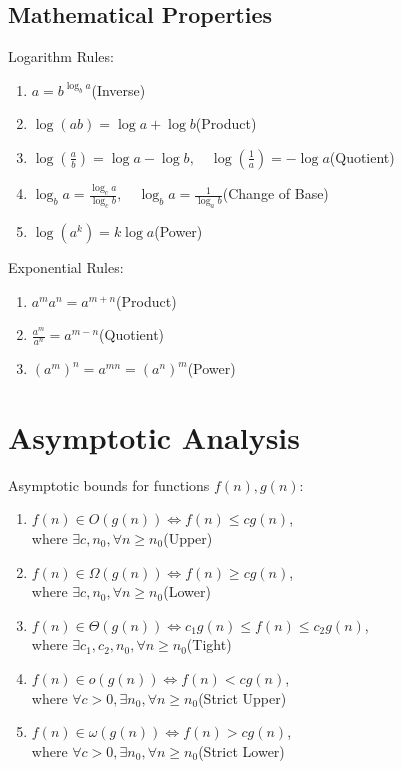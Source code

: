 \documentclass[12pt, a4paper]{article}
\begin{document}
\begin{multicols*}{3}
\subsection*{Mathematical Properties}
Logarithm Rules:
\begin{enumerate}[\roman*.]
  \item $a = b^{\log_ba}$\hfill(Inverse)
  \item $\log(ab) = \log a + \log b$\hfill(Product) 
  \item $\log(\frac{a}{b}) = \log a - \log b,\quad\log(\frac{1}{a}) = -\log a$\hfill(Quotient)
  \item $\log_ba = \frac{\log_ca}{\log_cb},\quad\log_ba = \frac{1}{\log_ab}$\hfill(Change of Base)
  \item $\log(a^k) = k\log a$\hfill(Power)
\end{enumerate}

Exponential Rules:
\begin{enumerate}[\roman*.]
  \item $a^m a^n = a^{m+n}$\hfill(Product) 
  \item $\frac{a^m}{a^n} = a^{m-n}$\hfill(Quotient)
  \item $(a^m)^n = a^{mn} = (a^n)^m$\hfill(Power)
\end{enumerate}

\colbreak
\section{Asymptotic Analysis}

Asymptotic bounds for functions $f(n), g(n)$:
\begin{enumerate}[\roman*.]
  \item $f(n) \in O(g(n)) \iff f(n) \leq cg(n)$,\\ where $\exists c, n_0, \forall n \geq n_0$\hfill(Upper)
  \item $f(n) \in \Omega(g(n)) \iff f(n) \geq cg(n)$,\\ where $\exists c, n_0, \forall n \geq n_0$\hfill(Lower)
  \item $f(n) \in \Theta(g(n)) \iff c_1g(n) \leq f(n) \leq c_2g(n)$,\\ where $\exists c_1, c_2, n_0, \forall n \geq n_0$\hfill(Tight)
  \item $f(n) \in o(g(n)) \iff f(n) < cg(n)$,\\ where $\forall c > 0, \exists n_0, \forall n \geq n_0$\hfill(Strict Upper)
  \item $f(n) \in \omega(g(n)) \iff f(n) > cg(n)$,\\ where $\forall c > 0, \exists n_0, \forall n \geq n_0$\hfill(Strict Lower)
\end{enumerate}


\end{multicols*}
\end{document}
